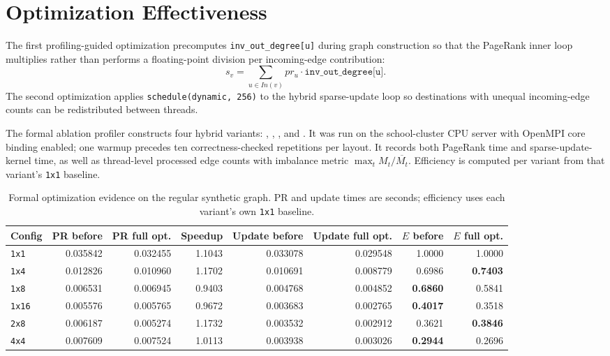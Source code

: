 \documentclass[11pt]{article}
\begin{document}
\section{Optimization Effectiveness}
\label{sec:wang-optimization}

The first profiling-guided optimization precomputes
\texttt{inv\_out\_degree[u]} during graph construction so that the
PageRank inner loop multiplies rather than performs a floating-point
division per incoming-edge contribution:
\[
s_v = \sum_{u\in In(v)} pr_u \cdot \texttt{inv\_out\_degree[u]}.
\]
The second optimization applies \texttt{schedule(dynamic, 256)} to the
hybrid sparse-update loop so destinations with unequal incoming-edge
counts can be redistributed between threads.

The formal ablation profiler constructs four hybrid variants:
, , , and
. It was run on the school-cluster CPU server with
OpenMPI core binding enabled; one warmup precedes ten
correctness-checked repetitions per layout. It records both PageRank
time and sparse-update-kernel time, as well as thread-level processed
edge counts with imbalance metric $\max_t M_t/\overline{M_t}$.
Efficiency is computed per variant from that variant's \texttt{1x1}
baseline.

\begin{table}[H]
\centering
\caption{Formal optimization evidence on the regular synthetic graph.
PR and update times are seconds; efficiency uses each variant's own
\texttt{1x1} baseline.}
\label{tab:wang-optimization-ablation}
\scriptsize
\begin{tabular}{lrrrrrrr}
\toprule
Config & PR before & PR full opt. & Speedup & Update before & Update full opt. & $E$ before & $E$ full opt. \\
\midrule
\texttt{1x1}  & 0.035842 & 0.032455 & 1.1043 & 0.033078 & 0.029548 & 1.0000 & 1.0000 \\
\texttt{1x4}  & 0.012826 & 0.010960 & 1.1702 & 0.010691 & 0.008779 & 0.6986 & \textbf{0.7403} \\
\texttt{1x8}  & 0.006531 & 0.006945 & 0.9403 & 0.004768 & 0.004852 & \textbf{0.6860} & 0.5841 \\
\texttt{1x16} & 0.005576 & 0.005765 & 0.9672 & 0.003683 & 0.002765 & \textbf{0.4017} & 0.3518 \\
\texttt{2x8}  & 0.006187 & 0.005274 & 1.1732 & 0.003532 & 0.002912 & 0.3621 & \textbf{0.3846} \\
\texttt{4x4}  & 0.007609 & 0.007524 & 1.0113 & 0.003938 & 0.003026 & \textbf{0.2944} & 0.2696 \\
\bottomrule
\end{tabular}
\end{table}
\end{document}

